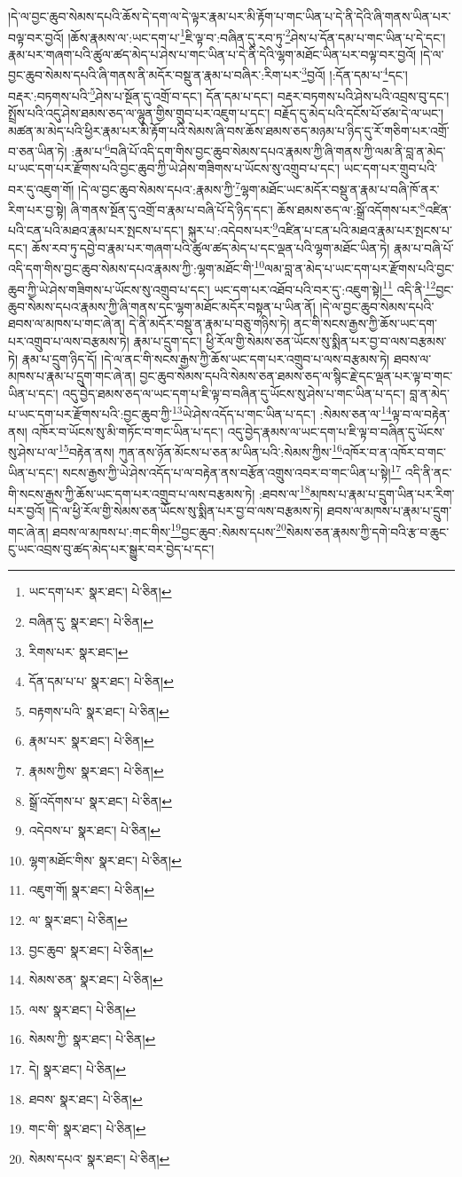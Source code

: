 །དེ་ལ་བྱང་ཆུབ་སེམས་དཔའི་ཆོས་དེ་དག་ལ་དེ་ལྟར་རྣམ་པར་མི་རྟོག་པ་གང་ཡིན་པ་དེ་ནི་དེའི་ཞི་གནས་ཡིན་པར་བལྟ་བར་བྱའོ། །ཆོས་རྣམས་ལ་:ཡང་དག་པ་\footnote{ཡང་དག་པར་  སྣར་ཐང་།  པེ་ཅིན། }ཇི་ལྟ་བ་:བཞིན་དུ་རབ་ཏུ་\footnote{བཞིན་དུ་  སྣར་ཐང་།  པེ་ཅིན། }ཤེས་པ་དོན་དམ་པ་གང་ཡིན་པ་དེ་དང་། རྣམ་པར་གཞག་པའི་ཚུལ་ཚད་མེད་པ་ཤེས་པ་གང་ཡིན་པ་དེ་ནི་དེའི་ལྷག་མཐོང་ཡིན་པར་བལྟ་བར་བྱའོ། །དེ་ལ་བྱང་ཆུབ་སེམས་དཔའི་ཞི་གནས་ནི་མདོར་བསྡུ་ན་རྣམ་པ་བཞིར་:རིག་པར་\footnote{རིགས་པར་  སྣར་ཐང་། }བྱའོ། །:དོན་དམ་པ་\footnote{དོན་དམ་པ་པ་  སྣར་ཐང་།  པེ་ཅིན། }དང་། བརྡར་:བཏགས་པའི་\footnote{བརྟགས་པའི་  སྣར་ཐང་།  པེ་ཅིན། }ཤེས་པ་སྔོན་དུ་འགྲོ་བ་དང་། དོན་དམ་པ་དང་། བརྡར་བཏགས་པའི་ཤེས་པའི་འབྲས་བུ་དང་། སྤྲོས་པའི་འདུ་ཤེས་ཐམས་ཅད་ལ་ལྷུན་གྱིས་གྲུབ་པར་འཇུག་པ་དང་། བརྗོད་དུ་མེད་པའི་དངོས་པོ་ཙམ་དེ་ལ་ཡང་། མཚན་མ་མེད་པའི་ཕྱིར་རྣམ་པར་མི་རྟོག་པའི་སེམས་ཞི་བས་ཆོས་ཐམས་ཅད་མཉམ་པ་ཉིད་དུ་རོ་གཅིག་པར་འགྲོ་བ་ཅན་ཡིན་ཏེ། :རྣམ་པ་\footnote{རྣམ་པར་  སྣར་ཐང་།  པེ་ཅིན། }བཞི་པོ་འདི་དག་གིས་བྱང་ཆུབ་སེམས་དཔའ་རྣམས་ཀྱི་ཞི་གནས་ཀྱི་ལམ་ནི་བླ་ན་མེད་པ་ཡང་དག་པར་རྫོགས་པའི་བྱང་ཆུབ་ཀྱི་ཡེ་ཤེས་གཟིགས་པ་ཡོངས་སུ་འགྲུབ་པ་དང་། ཡང་དག་པར་གྲུབ་པའི་བར་དུ་འཇུག་གོ། །དེ་ལ་བྱང་ཆུབ་སེམས་དཔའ་:རྣམས་ཀྱི་\footnote{རྣམས་ཀྱིས་  སྣར་ཐང་།  པེ་ཅིན། }ལྷག་མཐོང་ཡང་མདོར་བསྡུ་ན་རྣམ་པ་བཞི་ཁོ་ནར་རིག་པར་བྱ་སྟེ། ཞི་གནས་སྔོན་དུ་འགྲོ་བ་རྣམ་པ་བཞི་པོ་དེ་ཉིད་དང་། ཆོས་ཐམས་ཅད་ལ་:སྒྲོ་འདོགས་པར་\footnote{སྒྲོ་འདོགས་པ་  སྣར་ཐང་།  པེ་ཅིན། }འཛིན་པའི་ངན་པའི་མཐའ་རྣམ་པར་སྤངས་པ་དང་། སྐུར་པ་:འདེབས་པར་\footnote{འདེབས་པ་  སྣར་ཐང་།  པེ་ཅིན། }འཛིན་པ་ངན་པའི་མཐའ་རྣམ་པར་སྤངས་པ་དང་། ཆོས་རབ་ཏུ་དབྱེ་བ་རྣམ་པར་གཞག་པའི་ཚུལ་ཚད་མེད་པ་དང་ལྡན་པའི་ལྷག་མཐོང་ཡིན་ཏེ། རྣམ་པ་བཞི་པོ་འདི་དག་གིས་བྱང་ཆུབ་སེམས་དཔའ་རྣམས་ཀྱི་:ལྷག་མཐོང་གི་\footnote{ལྷག་མཐོང་གིས་  སྣར་ཐང་།  པེ་ཅིན། }ལམ་བླ་ན་མེད་པ་ཡང་དག་པར་རྫོགས་པའི་བྱང་ཆུབ་ཀྱི་ཡེ་ཤེས་གཟིགས་པ་ཡོངས་སུ་འགྲུབ་པ་དང་། ཡང་དག་པར་འཐོབ་པའི་བར་དུ་:འཇུག་སྟེ།\footnote{འཇུག་གོ།  སྣར་ཐང་།  པེ་ཅིན། } འདི་ནི་\footnote{ལ་  སྣར་ཐང་།  པེ་ཅིན། }བྱང་ཆུབ་སེམས་དཔའ་རྣམས་ཀྱི་ཞི་གནས་དང་ལྷག་མཐོང་མདོར་བསྟན་པ་ཡིན་ནོ། །དེ་ལ་བྱང་ཆུབ་སེམས་དཔའི་ཐབས་ལ་མཁས་པ་གང་ཞེ་ན། དེ་ནི་མདོར་བསྡུ་ན་རྣམ་པ་བཅུ་གཉིས་ཏེ། ནང་གི་སངས་རྒྱས་ཀྱི་ཆོས་ཡང་དག་པར་འགྲུབ་པ་ལས་བརྩམས་ཏེ། རྣམ་པ་དྲུག་དང་། ཕྱི་རོལ་གྱི་སེམས་ཅན་ཡོངས་སུ་སྨིན་པར་བྱ་བ་ལས་བརྩམས་ཏེ། རྣམ་པ་དྲུག་ཉིད་དོ། །དེ་ལ་ནང་གི་སངས་རྒྱས་ཀྱི་ཆོས་ཡང་དག་པར་འགྲུབ་པ་ལས་བརྩམས་ཏེ། ཐབས་ལ་མཁས་པ་རྣམ་པ་དྲུག་གང་ཞེ་ན། བྱང་ཆུབ་སེམས་དཔའི་སེམས་ཅན་ཐམས་ཅད་ལ་སྙིང་རྗེ་དང་ལྡན་པར་ལྟ་བ་གང་ཡིན་པ་དང་། འདུ་བྱེད་ཐམས་ཅད་ལ་ཡང་དག་པ་ཇི་ལྟ་བ་བཞིན་དུ་ཡོངས་སུ་ཤེས་པ་གང་ཡིན་པ་དང་། བླ་ན་མེད་པ་ཡང་དག་པར་རྫོགས་པའི་:བྱང་ཆུབ་ཀྱི་\footnote{བྱང་ཆུབ་  སྣར་ཐང་།  པེ་ཅིན། }ཡེ་ཤེས་འདོད་པ་གང་ཡིན་པ་དང་། :སེམས་ཅན་ལ་\footnote{སེམས་ཅན་  སྣར་ཐང་།  པེ་ཅིན། }ལྟ་བ་ལ་བརྟེན་ནས། འཁོར་བ་ཡོངས་སུ་མི་གཏོང་བ་གང་ཡིན་པ་དང་། འདུ་བྱེད་རྣམས་ལ་ཡང་དག་པ་ཇི་ལྟ་བ་བཞིན་དུ་ཡོངས་སུ་ཤེས་པ་ལ་\footnote{ལས་  སྣར་ཐང་།  པེ་ཅིན། }བརྟེན་ནས། ཀུན་ནས་ཉོན་མོངས་པ་ཅན་མ་ཡིན་པའི་:སེམས་ཀྱིས་\footnote{སེམས་ཀྱི་  སྣར་ཐང་།  པེ་ཅིན། }འཁོར་བ་ན་འཁོར་བ་གང་ཡིན་པ་དང་། སངས་རྒྱས་ཀྱི་ཡེ་ཤེས་འདོད་པ་ལ་བརྟེན་ནས་བརྩོན་འགྲུས་འབར་བ་གང་ཡིན་པ་སྟེ།\footnote{དེ།  སྣར་ཐང་།  པེ་ཅིན། } འདི་ནི་ནང་གི་སངས་རྒྱས་ཀྱི་ཆོས་ཡང་དག་པར་འགྲུབ་པ་ལས་བརྩམས་ཏེ། :ཐབས་ལ་\footnote{ཐབས་  སྣར་ཐང་།  པེ་ཅིན། }མཁས་པ་རྣམ་པ་དྲུག་ཡིན་པར་རིག་པར་བྱའོ། །དེ་ལ་ཕྱི་རོལ་གྱི་སེམས་ཅན་ཡོངས་སུ་སྨིན་པར་བྱ་བ་ལས་བརྩམས་ཏེ། ཐབས་ལ་མཁས་པ་རྣམ་པ་དྲུག་གང་ཞེ་ན། ཐབས་ལ་མཁས་པ་:གང་གིས་\footnote{གང་གི་  སྣར་ཐང་།  པེ་ཅིན། }བྱང་ཆུབ་:སེམས་དཔས་\footnote{སེམས་དཔའ་  སྣར་ཐང་།  པེ་ཅིན། }སེམས་ཅན་རྣམས་ཀྱི་དགེ་བའི་རྩ་བ་ཆུང་ངུ་ཡང་འབྲས་བུ་ཚད་མེད་པར་སྒྱུར་བར་བྱེད་པ་དང་། 